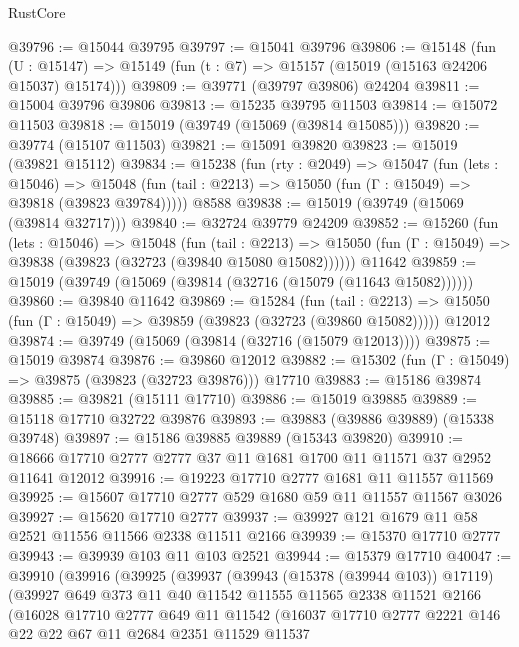 \begin{lexlean}{RustCore}
\begin{coremodule}
@39796 := @15044 @39795
@39797 := @15041 @39796
@39806 := @15148
    (fun (U : @15147) => @15149 (fun (t : @7) => @15157 (@15019 (@15163 @24206 @15037) @15174)))
@39809 := @39771 (@39797 @39806) @24204
@39811 := @15004 @39796 @39806
@39813 := @15235 @39795 @11503
@39814 := @15072 @11503
@39818 := @15019 (@39749 (@15069 (@39814 @15085)))
@39820 := @39774 (@15107 @11503)
@39821 := @15091 @39820
@39823 := @15019 (@39821 @15112)
@39834 := @15238
    (fun (rty : @2049) =>
    @15047
      (fun (lets : @15046) =>
      @15048 (fun (tail : @2213) => @15050 (fun (Γ : @15049) => @39818 (@39823 @39784)))))
    @8588
@39838 := @15019 (@39749 (@15069 (@39814 @32717)))
@39840 := @32724 @39779 @24209
@39852 := @15260
    (fun (lets : @15046) =>
    @15048
      (fun (tail : @2213) =>
      @15050 (fun (Γ : @15049) => @39838 (@39823 (@32723 (@39840 @15080 @15082))))))
    @11642
@39859 := @15019 (@39749 (@15069 (@39814 (@32716 (@15079 (@11643 @15082))))))
@39860 := @39840 @11642
@39869 := @15284
    (fun (tail : @2213) => @15050 (fun (Γ : @15049) => @39859 (@39823 (@32723 (@39860 @15082)))))
    @12012
@39874 := @39749 (@15069 (@39814 (@32716 (@15079 @12013))))
@39875 := @15019 @39874
@39876 := @39860 @12012
@39882 := @15302 (fun (Γ : @15049) => @39875 (@39823 (@32723 @39876))) @17710
@39883 := @15186 @39874
@39885 := @39821 (@15111 @17710)
@39886 := @15019 @39885
@39889 := @15118 @17710 @32722 @39876
@39893 := @39883 (@39886 @39889) (@15338 @39748)
@39897 := @15186 @39885 @39889 (@15343 @39820)
@39910 := @18666 @17710 @2777 @2777 @37 @11 @1681 @1700 @11 @11571 @37 @2952 @11641 @12012
@39916 := @19223 @17710 @2777 @1681 @11 @11557 @11569
@39925 := @15607 @17710 @2777 @529 @1680 @59 @11 @11557 @11567 @3026
@39927 := @15620 @17710 @2777
@39937 := @39927 @121 @1679 @11 @58 @2521 @11556 @11566 @2338 @11511 @2166
@39939 := @15370 @17710 @2777
@39943 := @39939 @103 @11 @103 @2521
@39944 := @15379 @17710
@40047 := @39910
    (@39916
      (@39925
        (@39937
          (@39943 (@15378 (@39944 @103)) @17119)
          (@39927
            @649
            @373
            @11
            @40
            @11542
            @11555
            @11565
            @2338
            @11521
            @2166
            (@16028
              @17710
              @2777
              @649
              @11
              @11542
              (@16037
                @17710
                @2777
                @2221
                @146
                @22
                @22
                @67
                @11
                @2684
                @2351
                @11529
                @11537

\end{coremodule}
\end{lexlean}

